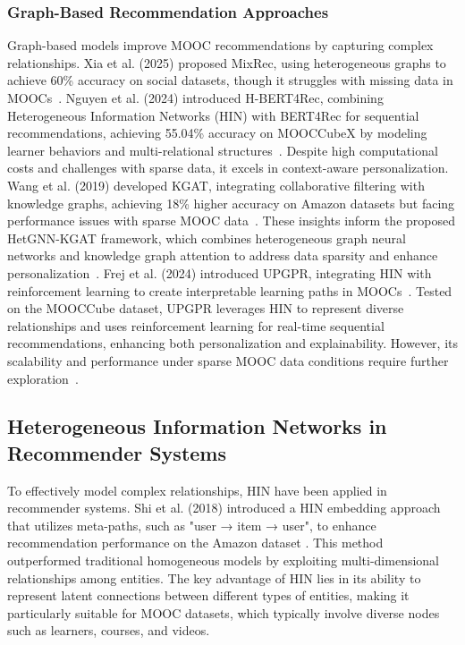 \documentclass{ieeeaccess}
\begin{document}
\subsubsection{Graph-Based Recommendation Approaches}
Graph-based models improve MOOC recommendations by capturing complex relationships. Xia et al. (2025) proposed MixRec, using heterogeneous graphs to achieve 60\% accuracy on social datasets, though it struggles with missing data in MOOCs~\cite{xia2025mixrec, kizilcec2015attrition_missing_MOOC}. Nguyen et al. (2024) introduced H-BERT4Rec, combining Heterogeneous Information Networks (HIN) with BERT4Rec for sequential recommendations, achieving 55.04\% accuracy on MOOCCubeX by modeling learner behaviors and multi-relational structures~\cite{nguyen2024hbert4rec, shi2018heterogeneous}. Despite high computational costs and challenges with sparse data, it excels in context-aware personalization. Wang et al. (2019) developed KGAT, integrating collaborative filtering with knowledge graphs, achieving 18\% higher accuracy on Amazon datasets but facing performance issues with sparse MOOC data~\cite{wang2019kgat, yu2021mooccubex}. These insights inform the proposed HetGNN-KGAT framework, which combines heterogeneous graph neural networks and knowledge graph attention to address data sparsity and enhance personalization~\cite{zhang2019hetgnn, wang2019kgat}. Frej et al. (2024) introduced UPGPR, integrating HIN with reinforcement learning to create interpretable learning paths in MOOCs~\cite{frej2024upgpr}. Tested on the MOOCCube dataset, UPGPR leverages HIN to represent diverse relationships and uses reinforcement learning for real-time sequential recommendations, enhancing both personalization and explainability. However, its scalability and performance under sparse MOOC data conditions require further exploration~\cite{kizilcec2015attrition_missing_MOOC}.

\subsection{Heterogeneous Information Networks in Recommender Systems}

To effectively model complex relationships, HIN have been applied in recommender systems. Shi et al. (2018) introduced a HIN embedding approach that utilizes meta-paths, such as "user → item → user", to enhance recommendation performance on the Amazon dataset \cite{shi2018heterogeneous}. This method outperformed traditional homogeneous models by exploiting multi-dimensional relationships among entities. The key advantage of HIN lies in its ability to represent latent connections between different types of entities, making it particularly suitable for MOOC datasets, which typically involve diverse nodes such as learners, courses, and videos.
\end{document}
